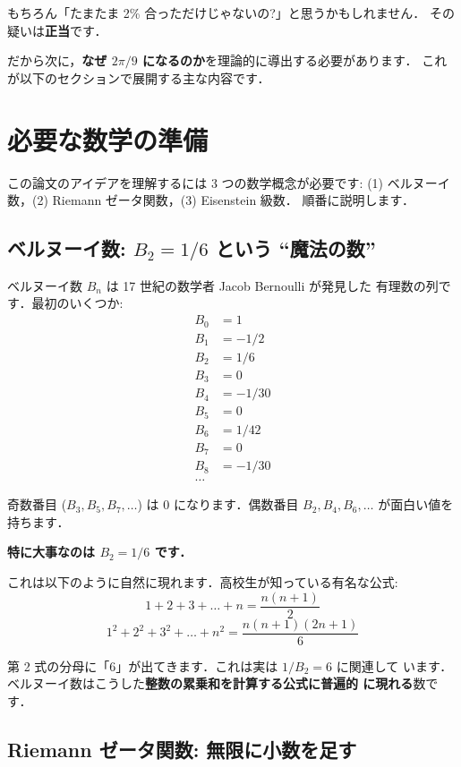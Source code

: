 \documentclass[11pt,a4paper]{article}
\begin{document}
もちろん「たまたま 2\% 合っただけじゃないの?」と思うかもしれません．
その疑いは\textbf{正当}です．

だから次に，\textbf{なぜ $2\pi/9$ になるのか}を理論的に導出する必要があります．
これが以下のセクションで展開する主な内容です．

\section{必要な数学の準備}

この論文のアイデアを理解するには 3 つの数学概念が必要です:
(1) ベルヌーイ数，(2) Riemann ゼータ関数，(3) Eisenstein 級数．
順番に説明します．

\subsection{ベルヌーイ数: $B_2 = 1/6$ という ``魔法の数''}

ベルヌーイ数 $B_n$ は 17 世紀の数学者 Jacob Bernoulli が発見した
有理数の列です．最初のいくつか:
\begin{align*}
B_0 &= 1\\
B_1 &= -1/2\\
B_2 &= 1/6\\
B_3 &= 0\\
B_4 &= -1/30\\
B_5 &= 0\\
B_6 &= 1/42\\
B_7 &= 0\\
B_8 &= -1/30\\
\ldots
\end{align*}

奇数番目 ($B_3, B_5, B_7, \ldots$) は $0$ になります．偶数番目 $B_2,
B_4, B_6, \ldots$ が面白い値を持ちます．

\textbf{特に大事なのは $B_2 = 1/6$ です．}

これは以下のように自然に現れます．高校生が知っている有名な公式:
\begin{equation*}
1 + 2 + 3 + \ldots + n = \frac{n(n+1)}{2}
\end{equation*}
\begin{equation*}
1^2 + 2^2 + 3^2 + \ldots + n^2 = \frac{n(n+1)(2n+1)}{6}
\end{equation*}

第 2 式の分母に「6」が出てきます．これは実は $1/B_2 = 6$ に関連して
います．ベルヌーイ数はこうした\textbf{整数の累乗和を計算する公式に普遍的
に現れる}数です．

\subsection{Riemann ゼータ関数: 無限に小数を足す}
\end{document}
